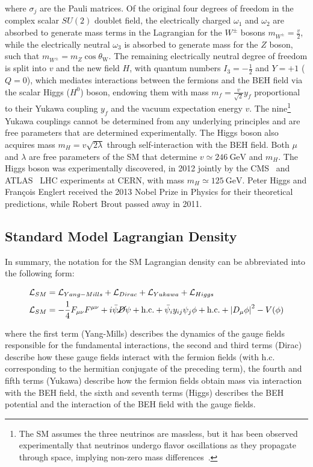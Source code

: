 where $\sigma_j$ are the Pauli matrices.
Of the original four degrees of freedom in the complex scalar $SU(2)$ doublet field, the electrically charged $\omega_1$ and $\omega_2$ are absorbed to generate mass terms in the Lagrangian for the $W^\pm$ bosons $m_{W^\pm} = \frac{v}{2}$, while the electrically neutral $\omega_3$ is absorbed to generate mass for the $Z$ boson, such that $m_{W^\pm} = m_Z \cos \theta_{\mathrm{W}}$.
The remaining electrically neutral degree of freedom is split into $v$ and the new field $H$, with quantum numbers $I_3 = -\frac{1}{2}$ and $Y = +1$ ($Q = 0$), which mediates interactions between the fermions and the BEH field via the scalar Higgs ($H^0$) boson, endowing them with mass $m_f = \frac{v}{\sqrt{2}} y_f$ proportional to their Yukawa coupling $y_f$ and the vacuum expectation energy $v$.
The nine\footnote{The SM assumes the three neutrinos are massless, but it has been observed experimentally that neutrinos undergo flavor oscillations as they propagate through space, implying non-zero mass differences~\cite{PhysRevLett.81.1562}.} Yukawa couplings cannot be determined from any underlying principles and are free parameters that are determined experimentally.
The Higgs boson also acquires mass $m_H = v \sqrt{2 \lambda}$ through self-interaction with the BEH field.
Both $\mu$ and $\lambda$ are free parameters of the SM that determine $v \simeq \SI{246}{\GeV}$ and $m_H$.
The Higgs boson was experimentally discovered, in 2012 jointly by the CMS~\cite{201230} and ATLAS~\cite{20121} LHC experiments at CERN, with mass $m_H \simeq \SI{125}{\GeV}$.
Peter Higgs and François Englert received the 2013 Nobel Prize in Physics for their theoretical predictions, while Robert Brout passed away in 2011.

\subsection{Standard Model Lagrangian Density}
In summary, the notation for the SM Lagrangian density can be abbreviated into the following form:
\begin{linenomath*}
\begin{align}
\mathcal{L}_{SM} &= \mathcal{L}_{Yang-Mills} + \mathcal{L}_{Dirac} + \mathcal{L}_{Yukawa} + \mathcal{L}_{Higgs} \\
\mathcal{L}_{SM} &= -\frac{1}{4} F_{\mu \nu} F^{\mu \nu} + i\bar{\psi} \cancel{D} \psi+\text {h.c.} + \bar{\psi}_i y_{i j} \psi_j \phi+\text {h.c.} + \left \vert D_\mu \phi\right \vert^2 - V(\phi)
\end{align}
\end{linenomath*}
where the first term (Yang-Mills) describes the dynamics of the gauge fields responsible for the fundamental interactions, the second and third terms (Dirac) describe how these gauge fields interact with the fermion fields (with h.c. corresponding to the hermitian conjugate of the preceding term), the fourth and fifth terms (Yukawa) describe how the fermion fields obtain mass via interaction with the BEH field, the sixth and seventh terms (Higgs) describes the BEH potential and the interaction of the BEH field with the gauge fields.

